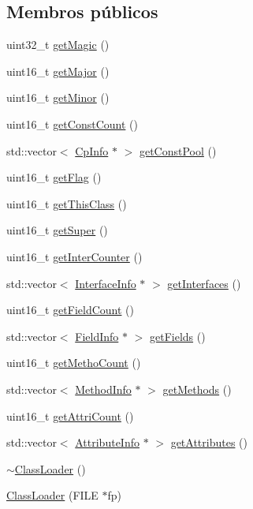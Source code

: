 \subsection*{Membros públicos}
\begin{DoxyCompactItemize}
\item 
uint32\+\_\+t \hyperlink{class_class_loader_a31dd114820bfdbfe628f2efb5effe963}{get\+Magic} ()
\item 
uint16\+\_\+t \hyperlink{class_class_loader_afc67f7bffc1f2b8ffd61b1dd217f62ad}{get\+Major} ()
\item 
uint16\+\_\+t \hyperlink{class_class_loader_a9bed0bf2ac88a23118e67777a14c0553}{get\+Minor} ()
\item 
uint16\+\_\+t \hyperlink{class_class_loader_a292f4c53de8057b6cb24f8b2e0839807}{get\+Const\+Count} ()
\item 
std\+::vector$<$ \hyperlink{class_cp_info}{Cp\+Info} $\ast$ $>$ \hyperlink{class_class_loader_a8f3dc8367a76e7a4594bd5e8206d3977}{get\+Const\+Pool} ()
\item 
uint16\+\_\+t \hyperlink{class_class_loader_a6154ac807d01c4281f9ccf6b23378197}{get\+Flag} ()
\item 
uint16\+\_\+t \hyperlink{class_class_loader_a3346ccdf7148ea48826d858326c4de00}{get\+This\+Class} ()
\item 
uint16\+\_\+t \hyperlink{class_class_loader_a390d1849bd7686e618a84eae6a7f60cf}{get\+Super} ()
\item 
uint16\+\_\+t \hyperlink{class_class_loader_acbc3563bd386c769b5beb3352e761e0a}{get\+Inter\+Counter} ()
\item 
std\+::vector$<$ \hyperlink{class_interface_info}{Interface\+Info} $\ast$ $>$ \hyperlink{class_class_loader_a357668e5a1442f1fb7618f04c1e0a951}{get\+Interfaces} ()
\item 
uint16\+\_\+t \hyperlink{class_class_loader_a58c1c2b982f56c630946408d1425f6f4}{get\+Field\+Count} ()
\item 
std\+::vector$<$ \hyperlink{class_field_info}{Field\+Info} $\ast$ $>$ \hyperlink{class_class_loader_a868fdfc297bfc310b21b3a41cdceb7b9}{get\+Fields} ()
\item 
uint16\+\_\+t \hyperlink{class_class_loader_acad870c7b405146242912190e1e71f7c}{get\+Metho\+Count} ()
\item 
std\+::vector$<$ \hyperlink{struct_method_info}{Method\+Info} $\ast$ $>$ \hyperlink{class_class_loader_ad4733587ddbe1ae25500c13181bfb5ca}{get\+Methods} ()
\item 
uint16\+\_\+t \hyperlink{class_class_loader_a047f5d93000be571f23484c809ab9b2d}{get\+Attri\+Count} ()
\item 
std\+::vector$<$ \hyperlink{class_attribute_info}{Attribute\+Info} $\ast$ $>$ \hyperlink{class_class_loader_a988add3569e32d42bc841f526d978e68}{get\+Attributes} ()
\item 
\hyperlink{class_class_loader_a62db678abd7f6954fa2f32a6f5a0b157}{$\sim$\+Class\+Loader} ()
\item 
\hyperlink{class_class_loader_a94dec2f34055621437170b6a5fb74d0a}{Class\+Loader} (F\+I\+LE $\ast$fp)
\end{DoxyCompactItemize}
